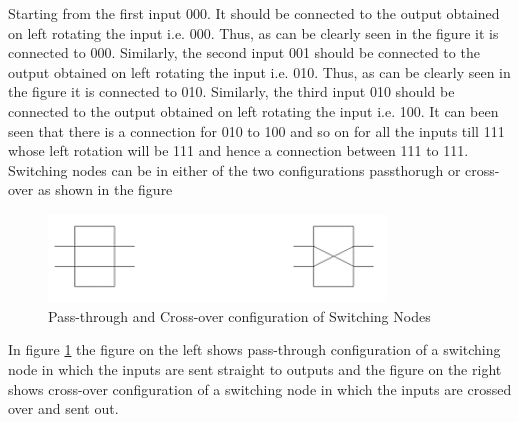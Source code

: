 \documentclass[12pt]{article}
\begin{document}
Starting from the first input 000. It should be connected to the output obtained on left rotating the input i.e. 000. 
Thus, as can be clearly seen in the figure it is connected to 000. Similarly, the second input 001 should be connected to the output obtained on left rotating the input i.e. 010.
Thus, as can be clearly seen in the figure it is connected to 010. Similarly, the third input 010 should be connected to the output obtained on left rotating the input i.e. 100. 
It can been seen that there is a connection for 010 to 100 and so on for all the inputs till 111 whose left rotation will be 111 and hence a connection between 111 to 111.
Switching nodes can be in either of the two configurations passthorugh or cross-over as shown in the figure 
\begin{figure}[H]
    \centering
    \includegraphics[width=0.8\textwidth]{images/switching.png}
    \caption{Pass-through and Cross-over configuration of Switching Nodes}
    \label{fig:switching}
\end{figure}
In figure \ref{fig:switching} the figure on the left shows pass-through configuration of a switching node in which the inputs are sent straight to outputs
and the figure on the right shows cross-over configuration of a switching node in which the inputs are crossed over and sent out.
\end{document}

